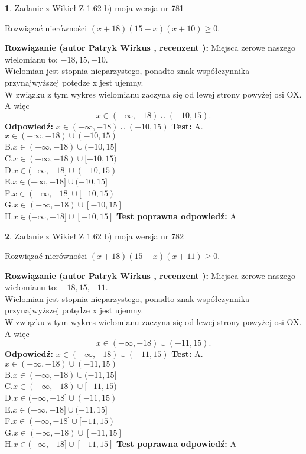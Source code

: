 \documentclass[12pt, a4paper]{article}
\theoremstyle{definition} %
\newtheorem{zad}{}
\newcommand{\zadStart}[1]{\begin{zad}#1\newline}
\newcommand{\zadStop}{\end{zad}}
\newcommand{\rozwStart}[2]{\noindent \textbf{Rozwiązanie (autor #1 , recenzent #2): }\newline}
\newcommand{\rozwStop}{\newline}
\newcommand{\odpStart}{\noindent \textbf{Odpowiedź:}\newline}
\newcommand{\odpStop}{\newline}
\newcommand{\testStart}{\noindent \textbf{Test:}\newline}
\newcommand{\testStop}{\newline}
\newcommand{\kluczStart}{\noindent \textbf{Test poprawna odpowiedź:}\newline}
\newcommand{\kluczStop}{\newline}
\begin{document}
\zadStart{Zadanie z Wikieł Z 1.62 b) moja wersja nr 781}

Rozwiązać nierówności $(x+18)(15-x)(x+10)\ge0$.
\zadStop
\rozwStart{Patryk Wirkus}{}
Miejsca zerowe naszego wielomianu to: $-18, 15, -10$.\\
Wielomian jest stopnia nieparzystego, ponadto znak współczynnika przy\linebreak najwyższej potędze x jest ujemny.\\ W związku z tym wykres wielomianu zaczyna się od lewej strony powyżej osi OX. A więc $$x \in (-\infty,-18) \cup (-10,15).$$
\rozwStop
\odpStart
$x \in (-\infty,-18) \cup (-10,15)$
\odpStop
\testStart
A.$x \in (-\infty,-18) \cup (-10,15)$\\
B.$x \in (-\infty,-18) \cup (-10,15]$\\
C.$x \in (-\infty,-18) \cup [-10,15)$\\
D.$x \in (-\infty,-18] \cup (-10,15)$\\
E.$x \in (-\infty,-18] \cup (-10,15]$\\
F.$x \in (-\infty,-18] \cup [-10,15)$\\
G.$x \in (-\infty,-18) \cup [-10,15]$\\
H.$x \in (-\infty,-18] \cup [-10,15]$
\testStop
\kluczStart
A
\kluczStop



\zadStart{Zadanie z Wikieł Z 1.62 b) moja wersja nr 782}

Rozwiązać nierówności $(x+18)(15-x)(x+11)\ge0$.
\zadStop
\rozwStart{Patryk Wirkus}{}
Miejsca zerowe naszego wielomianu to: $-18, 15, -11$.\\
Wielomian jest stopnia nieparzystego, ponadto znak współczynnika przy\linebreak najwyższej potędze x jest ujemny.\\ W związku z tym wykres wielomianu zaczyna się od lewej strony powyżej osi OX. A więc $$x \in (-\infty,-18) \cup (-11,15).$$
\rozwStop
\odpStart
$x \in (-\infty,-18) \cup (-11,15)$
\odpStop
\testStart
A.$x \in (-\infty,-18) \cup (-11,15)$\\
B.$x \in (-\infty,-18) \cup (-11,15]$\\
C.$x \in (-\infty,-18) \cup [-11,15)$\\
D.$x \in (-\infty,-18] \cup (-11,15)$\\
E.$x \in (-\infty,-18] \cup (-11,15]$\\
F.$x \in (-\infty,-18] \cup [-11,15)$\\
G.$x \in (-\infty,-18) \cup [-11,15]$\\
H.$x \in (-\infty,-18] \cup [-11,15]$
\testStop
\kluczStart
A
\kluczStop
\end{document}
